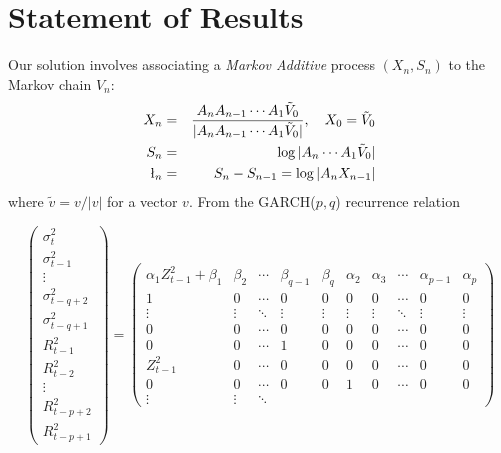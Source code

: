 \documentclass[aoas,preprint]{imsart}
\numberwithin{equation}{section}
\theoremstyle{plain}
\begin{document}
\section{Statement of Results}
Our solution involves associating a {\em Markov Additive} process
$(X_n, S_n)$ to the Markov chain $V_n$:
\begin{eqnarray*}
X_n &=& {
        A_n A_{n-1} \cdots A_1 \tilde V_0
        \over
        |A_n A_{n-1} \cdots A_1 \tilde V_0|
      }, \quad X_0 = \tilde V_0\\
S_n &=& \log |A_n \cdots A_1 \tilde V_0| \\
\l_n &=& S_n - S_{n-1} = \log |A_n X_{n-1}|
\end{eqnarray*}
where $\tilde v = v/|v|$  for a vector $v$. From the GARCH($p, q$)
recurrence relation
\begin{tiny}
  \begin{equation*}
      \begin{pmatrix}
        \sigma_{t}^2 \\
        \sigma_{t-1}^2 \\
        \vdots \\
        \sigma_{t-q+2}^2 \\
        \sigma_{t-q+1}^2 \\
        R_{t-1}^2 \\
        R_{t-2}^2 \\
        \vdots \\
        R_{t-p+2}^2 \\
        R_{t-p+1}^2
      \end{pmatrix}
      =
      \begin{pmatrix}
        \alpha_1 Z_{t-1}^2 + \beta_1 & \beta_2 & \cdots &
        \beta_{q-1} & \beta_q & \alpha_2 & \alpha_3 &
        \cdots & \alpha_{p-1} & \alpha_p\\
        1 & 0 & \cdots & 
        0 & 0 & 0 & 0 & \cdots & 0 & 0 \\
        \vdots & \vdots & \ddots & 
        \vdots & \vdots & \vdots & \vdots &
        \ddots & \vdots & \vdots \\
        0 & 0 & \cdots &
        0 & 0 & 0 & 0 & \cdots & 0 & 0 \\
        0 & 0 & \cdots &
        1 & 0 & 0 & 0 & \cdots & 0 & 0 \\
        Z_{t-1}^2 & 0 & \cdots &
        0 & 0 & 0 & 0 & \cdots & 0 & 0 \\
        0 & 0 & \cdots &
        0 & 0 & 1 & 0 & \cdots & 0 & 0 \\
        \vdots & \vdots & \ddots &

\end{pmatrix}
\end{equation*}
\end{tiny}
\end{document}

